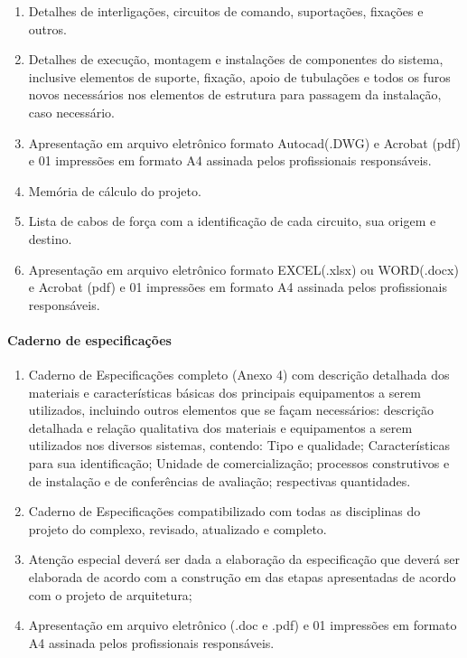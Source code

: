 \begin{enumerate}
		\item Detalhes de interligações, circuitos de comando, suportações, fixações e outros.

		\item Detalhes de execução, montagem e instalações de componentes do sistema, inclusive elementos de suporte, fixação, apoio de tubulações e todos os furos novos necessários nos elementos de estrutura para passagem da instalação, caso necessário.

		\item Apresentação em arquivo eletrônico formato Autocad(.DWG) e Acrobat (pdf) e 01 impressões em formato A4 assinada pelos profissionais responsáveis.
	
		\item Memória de cálculo do projeto.

		\item Lista de cabos de força com a identificação de cada circuito, sua origem e destino.
		
		\item Apresentação em arquivo eletrônico formato EXCEL(.xlsx) ou WORD(.docx) e Acrobat (pdf) e 01 impressões em formato A4 assinada pelos profissionais responsáveis.
		

	\end{enumerate}

\paragraph{Caderno de especificações}
	\begin{enumerate}

		\item Caderno de Especificações completo (Anexo 4) com descrição detalhada dos materiais e características básicas dos principais equipamentos a serem utilizados, incluindo outros elementos que se façam necessários: descrição detalhada e relação qualitativa dos materiais e equipamentos a serem utilizados nos diversos sistemas, contendo: Tipo e qualidade; Características para sua identificação; Unidade de comercialização; processos construtivos e de instalação e de conferências de avaliação; respectivas quantidades.

		\item Caderno de Especificações compatibilizado com todas as disciplinas do projeto do complexo, revisado, atualizado e completo.

		\item Atenção especial deverá ser dada a elaboração da especificação que deverá ser elaborada de acordo com a construção em das etapas apresentadas de acordo com o projeto de arquitetura;

		\item Apresentação em arquivo eletrônico (.doc e .pdf) e 01 impressões em formato A4 assinada pelos profissionais responsáveis.
	\end{enumerate}

